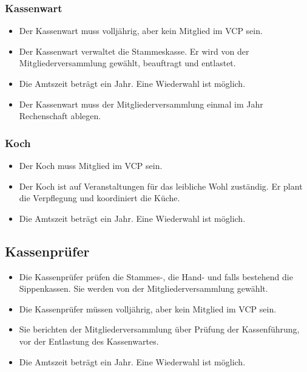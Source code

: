 \documentclass[a4paper]{article}
\begin{document}
    \subsubsection{Kassenwart} %
    \label{ssub:kassenwart}
	\begin{itemize}
		\item Der Kassenwart muss volljährig, aber kein Mitglied im VCP sein. 
		\item Der Kassenwart verwaltet die Stammeskasse. Er wird von der Mitgliederversammlung gewählt, beauftragt und entlastet. 
		\item Die Amtszeit beträgt ein Jahr. Eine Wiederwahl ist möglich. 
		\item Der Kassenwart muss der Mitgliederversammlung einmal im Jahr Rechenschaft ablegen. 
	\end{itemize}
    
    \subsubsection{Koch} %
    \label{ssub:koch}
	\begin{itemize}
		\item Der Koch muss Mitglied im VCP sein. 
		\item Der Koch ist auf Veranstaltungen für das leibliche Wohl zuständig. Er plant die Verpflegung und koordiniert die Küche. 
		\item Die Amtszeit beträgt ein Jahr. Eine Wiederwahl ist möglich. 
	\end{itemize}
    
    
    \subsection{Kassenprüfer} %
    \label{sub:kassenprufer}
	\begin{itemize}
		\item Die Kassenprüfer prüfen die Stammes-, die Hand- und falls bestehend die Sippenkassen. Sie werden von der Mitgliederversammlung gewählt. 
		\item Die Kassenprüfer müssen volljährig, aber kein Mitglied im VCP sein. 
		\item Sie berichten der Mitgliederversammlung über Prüfung der Kassenführung, vor der Entlastung des Kassenwartes. 
		\item Die Amtszeit beträgt ein Jahr. Eine Wiederwahl ist möglich. 
	\end{itemize}
    
\end{document}

